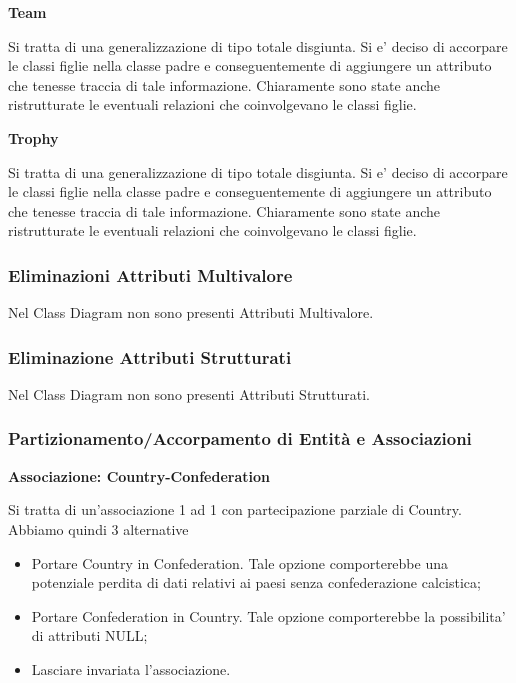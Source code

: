 \textbf{Team}

Si tratta di una generalizzazione di tipo totale disgiunta. Si e' deciso di accorpare le
classi figlie nella classe padre e conseguentemente di aggiungere un attributo che tenesse traccia
di tale informazione.
Chiaramente sono state anche ristrutturate le eventuali relazioni che coinvolgevano le classi figlie.

\textbf{Trophy}

Si tratta di una generalizzazione di tipo totale disgiunta. Si e' deciso di accorpare le
classi figlie nella classe padre e conseguentemente di aggiungere un attributo che tenesse traccia
di tale informazione.
Chiaramente sono state anche ristrutturate le eventuali relazioni che coinvolgevano le classi figlie.


\newpage
\subsubsection{Eliminazioni Attributi Multivalore}
\bigskip

Nel Class Diagram non sono presenti Attributi Multivalore.

\bigskip
\subsubsection{Eliminazione Attributi Strutturati}
\bigskip

Nel Class Diagram non sono presenti Attributi Strutturati.

\bigskip
\subsubsection{Partizionamento/Accorpamento di Entità e Associazioni}
\bigskip

\textbf{Associazione: Country-Confederation}

Si tratta di un'associazione 1 ad 1 con partecipazione parziale di Country.
Abbiamo quindi 3 alternative
\begin{itemize}
	\item Portare Country in Confederation. Tale opzione comporterebbe una potenziale
		perdita di dati relativi ai paesi senza confederazione calcistica;
	\item Portare Confederation in Country. Tale opzione comporterebbe la possibilita'
		di attributi NULL;
	\item Lasciare invariata l'associazione.
\end{itemize}

